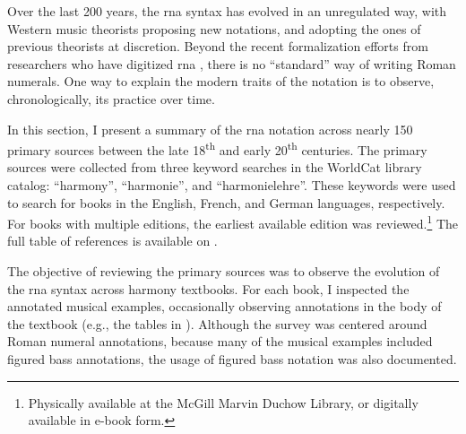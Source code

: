 

Over the last 200 years, the \gls{rna} syntax has evolved in
an unregulated way, with Western music theorists proposing
new notations, and adopting the ones of previous theorists
at discretion. Beyond the recent formalization efforts from
researchers who have digitized \gls{rna}
\parencite{huron1994humdrum, napoleslopez2017automatic,
neuwirth2018annotated, gotham2019romantext,
napoleslopez2020harmalysis, hentschel2021annotated}, there
is no ``standard'' way of writing Roman numerals. One way to
explain the modern traits of the notation is to observe,
chronologically, its practice over time.

In this section, I present a summary of the \gls{rna}
notation across nearly 150 primary sources between the late
18\textsuperscript{th} and early 20\textsuperscript{th}
centuries. The primary sources were collected from three
keyword searches in the
WorldCat library
catalog: ``harmony'', ``harmonie'', and ``harmonielehre''.
These keywords were used to search for books in the English,
French, and German languages, respectively. For books with
multiple editions, the earliest available edition was
reviewed.\footnote{Physically available at the McGill Marvin
Duchow Library, or digitally available in e-book form.} The
full table of references is available on
.


The objective of reviewing the primary sources was to
observe the evolution of the \gls{rna} syntax across harmony
textbooks. For each book, I inspected the annotated musical
examples, occasionally observing annotations in the body of
the textbook (e.g., the tables in
\textcite{kirnberger1774kunst}). Although the survey was
centered around Roman numeral annotations, because many of
the musical examples included figured bass annotations, the
usage of figured bass notation was also documented. 
